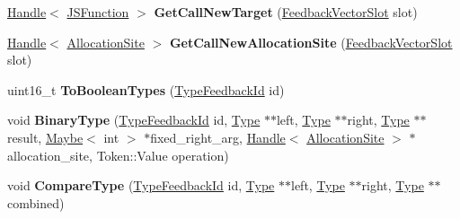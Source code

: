 \begin{DoxyCompactItemize}
\item 
\hyperlink{classv8_1_1internal_1_1_handle}{Handle}$<$ \hyperlink{classv8_1_1internal_1_1_j_s_function}{J\+S\+Function} $>$ {\bfseries Get\+Call\+New\+Target} (\hyperlink{classv8_1_1internal_1_1_feedback_vector_slot}{Feedback\+Vector\+Slot} slot)\hypertarget{classv8_1_1internal_1_1_type_feedback_oracle_af187abb6d889b46947dcb962c0ec3ff1}{}\label{classv8_1_1internal_1_1_type_feedback_oracle_af187abb6d889b46947dcb962c0ec3ff1}

\item 
\hyperlink{classv8_1_1internal_1_1_handle}{Handle}$<$ \hyperlink{classv8_1_1internal_1_1_allocation_site}{Allocation\+Site} $>$ {\bfseries Get\+Call\+New\+Allocation\+Site} (\hyperlink{classv8_1_1internal_1_1_feedback_vector_slot}{Feedback\+Vector\+Slot} slot)\hypertarget{classv8_1_1internal_1_1_type_feedback_oracle_aefca489f1e1781cec6f47ab4a9af7980}{}\label{classv8_1_1internal_1_1_type_feedback_oracle_aefca489f1e1781cec6f47ab4a9af7980}

\item 
uint16\+\_\+t {\bfseries To\+Boolean\+Types} (\hyperlink{classv8_1_1internal_1_1_type_feedback_id}{Type\+Feedback\+Id} id)\hypertarget{classv8_1_1internal_1_1_type_feedback_oracle_aed6c2119c2d6fa4960d1df5ca33d58ed}{}\label{classv8_1_1internal_1_1_type_feedback_oracle_aed6c2119c2d6fa4960d1df5ca33d58ed}

\item 
void {\bfseries Binary\+Type} (\hyperlink{classv8_1_1internal_1_1_type_feedback_id}{Type\+Feedback\+Id} id, \hyperlink{classv8_1_1internal_1_1_type}{Type} $\ast$$\ast$left, \hyperlink{classv8_1_1internal_1_1_type}{Type} $\ast$$\ast$right, \hyperlink{classv8_1_1internal_1_1_type}{Type} $\ast$$\ast$result, \hyperlink{classv8_1_1_maybe}{Maybe}$<$ int $>$ $\ast$fixed\+\_\+right\+\_\+arg, \hyperlink{classv8_1_1internal_1_1_handle}{Handle}$<$ \hyperlink{classv8_1_1internal_1_1_allocation_site}{Allocation\+Site} $>$ $\ast$allocation\+\_\+site, Token\+::\+Value operation)\hypertarget{classv8_1_1internal_1_1_type_feedback_oracle_a35406384995a244132cd15e85c6d2200}{}\label{classv8_1_1internal_1_1_type_feedback_oracle_a35406384995a244132cd15e85c6d2200}

\item 
void {\bfseries Compare\+Type} (\hyperlink{classv8_1_1internal_1_1_type_feedback_id}{Type\+Feedback\+Id} id, \hyperlink{classv8_1_1internal_1_1_type}{Type} $\ast$$\ast$left, \hyperlink{classv8_1_1internal_1_1_type}{Type} $\ast$$\ast$right, \hyperlink{classv8_1_1internal_1_1_type}{Type} $\ast$$\ast$combined)\hypertarget{classv8_1_1internal_1_1_type_feedback_oracle_a2240e0d4e848af6e34a89195be298dd4}{}\label{classv8_1_1internal_1_1_type_feedback_oracle_a2240e0d4e848af6e34a89195be298dd4}


\end{DoxyCompactItemize}
